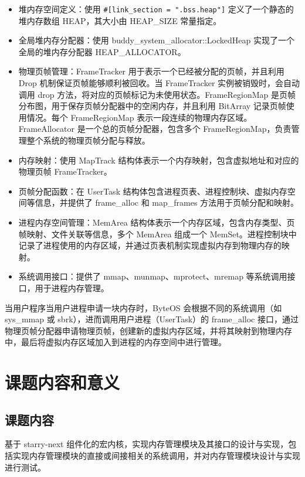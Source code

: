 \begin{itemize}
\item 堆内存空间定义：使用 \verb|#[link_section = ".bss.heap"]| 定义了一个静态的堆内存数组 HEAP，其大小由 HEAP\_SIZE 常量指定。
\item 全局堆内存分配器：使用 buddy\_system\_allocator::LockedHeap 实现了一个全局的堆内存分配器 HEAP\_ALLOCATOR。
\item 物理页帧管理：FrameTracker 用于表示一个已经被分配的页帧，并且利用 Drop 机制保证页帧能够顺利被回收。当 FrameTracker 实例被销毁时，会自动调用 drop 方法，将对应的页帧标记为未使用状态。FrameRegionMap 是页帧分布图，用于保存页帧分配器中的空闲内存，并且利用 BitArray 记录页帧使用情况。每个 FrameRegionMap 表示一段连续的物理内存区域。FrameAllocator 是一个总的页帧分配器，包含多个 FrameRegionMap，负责管理整个系统的物理页帧分配与释放。
\item 内存映射：使用 MapTrack 结构体表示一个内存映射，包含虚拟地址和对应的物理页帧 FrameTracker。
\item 页帧分配函数：在 UserTask 结构体包含进程页表、进程控制块、虚拟内存空间等信息，并提供了 frame\_alloc 和 map\_frames 方法用于页帧分配和映射。
\item 进程内存空间管理：MemArea 结构体表示一个内存区域，包含内存类型、页帧映射、文件关联等信息，多个 MemArea 组成一个 MemSet。进程控制块中记录了进程使用的内存区域，并通过页表机制实现虚拟内存到物理内存的映射。
\item 系统调用接口：提供了 mmap、munmap、mprotect、mremap 等系统调用接口，用于进程内存管理。
\end{itemize}

当用户程序当用户进程申请一块内存时，ByteOS 会根据不同的系统调用（如 sys\_mmap 或 sbrk），进而调用用户进程（UserTask）的 frame\_alloc 接口，通过物理页帧分配器申请物理页帧，创建新的虚拟内存区域，并将其映射到物理内存中，最后将虚拟内存区域加入到进程的内存空间中进行管理。

\section{课题内容和意义}

\subsection{课题内容}

基于 starry-next 组件化的宏内核，实现内存管理模块及其接口的设计与实现，包括实现内存管理模块的直接或间接相关的系统调用，并对内存管理模块设计与实现进行测试。

